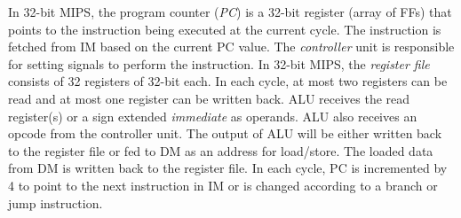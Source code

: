 In 32-bit MIPS, the program counter (\emph{PC}) is a 32-bit register (array of FFs) that points to the instruction being executed at the current cycle.
The instruction is fetched from IM based on the current PC value.
The \emph{controller} unit is responsible for setting signals to perform the instruction.
In 32-bit MIPS, the \emph{register file} consists of 32 registers of 32-bit each.
In each cycle, at most two registers can be read and at most one register can be written back.
ALU receives the read register(s) or a sign extended \emph{immediate} as operands.
ALU also receives an opcode from the controller unit.
The output of ALU will be either written back to the register file or fed to DM as an address for load/store.
The loaded data from DM is written back to the register file.
In each cycle, PC is incremented by 4 to point to the next instruction in IM or is changed according to a branch or jump instruction.
